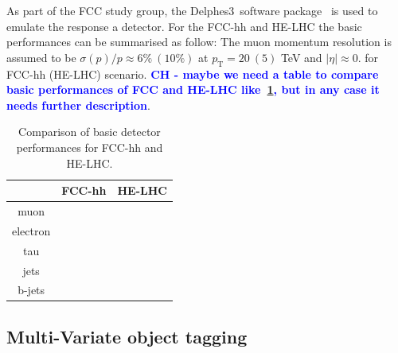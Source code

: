 \documentclass[a4paper,11pt]{article}
\newcommand{\CH}[1] {\textbf{\textcolor{blue}{CH - #1}}}
\newcommand{\pt}{\ensuremath{p_{\text{T}}}}
\newcommand{\delphes}{{\sc Delphes3}}
\begin{document}
As part of the FCC study group, the \delphes\ software package~\cite{deFavereau:2013fsa} is used to emulate the response a detector.
For the FCC-hh and HE-LHC the basic performances can be summarised as follow: The muon momentum resolution is assumed to be $\sigma(p)/p \approx 6\%~(10\%)$ at $\pt= 20~(5)$ TeV and $|\eta| \approx 0.$ for FCC-hh (HE-LHC) scenario.
\CH{maybe we need a table to compare basic performances of FCC and HE-LHC like~\ref{tab:delphes_comp}, but in any case it needs further description}.

\begin{table}[!htb]\centering
\begin{tabular}{|c|c|c|}
\hline
 & FCC-hh & HE-LHC \\
\hline
 muon & & \\
\hline
 electron  & & \\
\hline
 tau  & & \\
\hline
 jets & & \\
\hline
  b-jets  & & \\
\hline
\end{tabular}
\caption{Comparison of basic detector performances for FCC-hh and HE-LHC.}
\label{tab:delphes_comp}
\end{table}


\subsection{Multi-Variate object tagging}
\label{subsec:mvatagger}
\end{document}
